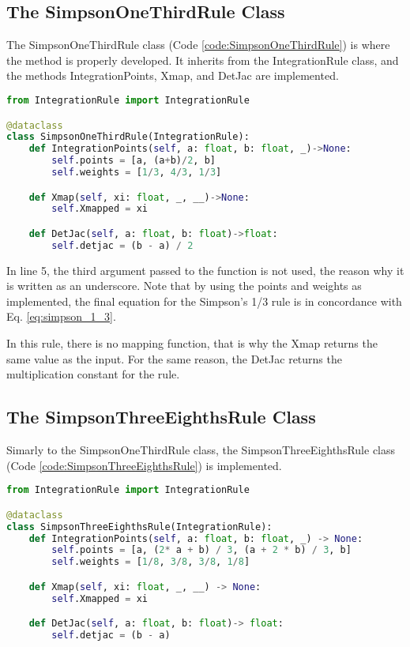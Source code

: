 \subsection{The SimpsonOneThirdRule Class}
The SimpsonOneThirdRule class (Code \ref{code:SimpsonOneThirdRule}) is where the method is properly developed. It inherits from the IntegrationRule class, and the methods IntegrationPoints, Xmap, and DetJac are implemented.
\begin{lstlisting}[language=python, caption={SimpsonOneThirdRule Class.}, label={code:SimpsonOneThirdRule}]
from IntegrationRule import IntegrationRule

@dataclass 
class SimpsonOneThirdRule(IntegrationRule):
    def IntegrationPoints(self, a: float, b: float, _)->None:
        self.points = [a, (a+b)/2, b]
        self.weights = [1/3, 4/3, 1/3]

    def Xmap(self, xi: float, _, __)->None:
        self.Xmapped = xi

    def DetJac(self, a: float, b: float)->float:
        self.detjac = (b - a) / 2
\end{lstlisting}

In line 5, the third argument passed to the function is not used, the reason why it is written as an underscore. Note that by using the points and weights as implemented, the final equation for the Simpson's 1/3 rule is in concordance with Eq. \eqref{eq:simpson_1_3}. 

In this rule, there is no mapping function, that is why the Xmap returns the same value as the input. For the same reason, the DetJac returns the multiplication constant for the rule.


\subsection{The SimpsonThreeEighthsRule Class}
Simarly to the SimpsonOneThirdRule class, the SimpsonThreeEighthsRule class (Code \ref{code:SimpsonThreeEighthsRule}) is implemented.
\begin{lstlisting}[language=python, caption={SimpsonThreeEighthsRule Class.}, label={code:SimpsonThreeEighthsRule}]
from IntegrationRule import IntegrationRule

@dataclass
class SimpsonThreeEighthsRule(IntegrationRule):
    def IntegrationPoints(self, a: float, b: float, _) -> None:
        self.points = [a, (2* a + b) / 3, (a + 2 * b) / 3, b]
        self.weights = [1/8, 3/8, 3/8, 1/8]

    def Xmap(self, xi: float, _, __) -> None:
        self.Xmapped = xi

    def DetJac(self, a: float, b: float)-> float:
        self.detjac = (b - a)
\end{lstlisting}

